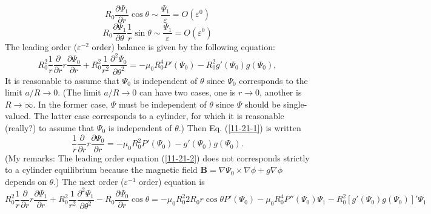 \documentclass{llncs}
\begin{document}
\begin{equation}
  R_0 \frac{\partial \Psi_1}{\partial r} \cos \theta \sim
  \frac{\Psi_1}{\varepsilon} = O (\varepsilon^0)
\end{equation}
\begin{equation}
  R_0 \frac{\partial \Psi_1}{\partial \theta}  \frac{1}{r} \sin \theta \sim
  \frac{\Psi_1}{\varepsilon} = O (\varepsilon^0)
\end{equation}
The leading order ($\varepsilon^{- 2}$ order) balance is given by the
following equation:
\begin{equation}
  \label{11-21-1} R_0^2 \frac{1}{r}  \frac{\partial}{\partial r} r
  \frac{\partial \Psi_0}{\partial r} + R_0^2 \frac{1}{r^2}  \frac{\partial^2
  \Psi_0}{\partial \theta^2} = - \mu_0 R_0^4 P' (\Psi_0) - R_0^2 g' (\Psi_0) g
  (\Psi_0),
\end{equation}
It is reasonable to assume that $\Psi_0$ is independent of $\theta$ since
$\Psi_0$ corresponds to the limit $a / R \rightarrow 0$. (The limit $a / R
\rightarrow 0$ can have two cases, one is $r \rightarrow 0$, another is $R
\rightarrow \infty$. In the former case, $\Psi$ must be independent of
$\theta$ since $\Psi$ should be single-valued. The latter case corresponds to
a cylinder, for which it is reasonable (really?) to assume that $\Psi_0$ is
independent of $\theta$.) Then Eq. (\ref{11-21-1}) is written
\begin{equation}
  \label{11-21-2} \frac{1}{r}  \frac{\partial}{\partial r} r \frac{\partial
  \Psi_0}{\partial r} = - \mu_0 R_0^2 P' (\Psi_0) - g' (\Psi_0) g (\Psi_0) .
\end{equation}
(My remarks: The leading order equation (\ref{11-21-2}) does not corresponds
strictly to a cylinder equilibrium because the magnetic field $\mathbf{B}=
\nabla \Psi_0 \times \nabla \phi + g \nabla \phi$ depends on $\theta$.) The
next order ($\varepsilon^{- 1}$ order) equation is
\[ R_0^2 \frac{1}{r}  \frac{\partial}{\partial r} r \frac{\partial
   \Psi_1}{\partial r} + R_0^2 \frac{1}{r^2}  \frac{\partial^2
   \Psi_1}{\partial \theta^2} - R_0  \frac{\partial \Psi_0}{\partial r} \cos
   \theta = - \mu_0 R_0^2 2 R_0 r \cos \theta P' (\Psi_0) - \mu_0 R_0^4 P''
   (\Psi_0) \Psi_1 - R_0^2 [g' (\Psi_0) g (\Psi_0)]' \Psi_1 \]
\end{document}
